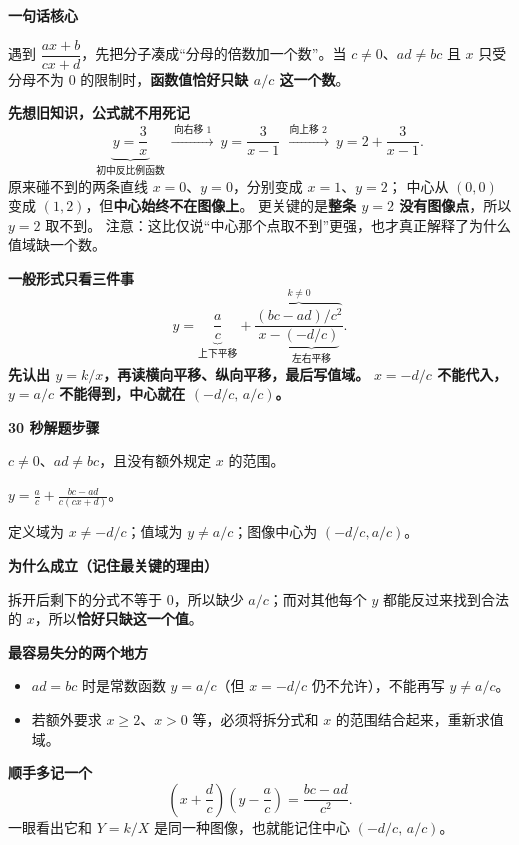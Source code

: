 \begin{summarybox}
    \textbf{\textcolor{CSummary}{一句话核心}}

    遇到 $\dfrac{ax+b}{cx+d}$，先把分子凑成“分母的倍数加一个数”。当 $c\ne0$、$ad\ne bc$ 且 $x$ 只受分母不为 $0$ 的限制时，\textbf{函数值恰好只缺 $a/c$ 这一个数}。

    \medskip

    \medskip
    \textbf{\textcolor{CSummary}{先想旧知识，公式就不用死记}}
    \[
      \underbrace{y=\frac3x}_{\text{初中反比例函数}}
      \ \xrightarrow{\ \text{向右移 }1\ }\
      y=\frac3{x-1}
      \ \xrightarrow{\ \text{向上移 }2\ }\
      \boxed{y=2+\frac3{x-1}}.
    \]
    原来碰不到的两条直线 $x=0$、$y=0$，分别变成 $x=1$、$y=2$；
    中心从 $(0,0)$ 变成 $(1,2)$，但\textbf{中心始终不在图像上}。
    更关键的是\textbf{整条 $y=2$ 没有图像点}，所以 $y=2$ 取不到。
    注意：这比仅说“中心那个点取不到”更强，也才真正解释了为什么值域缺一个数。

    \textbf{\textcolor{CSummary}{一般形式只看三件事}}
    \[
       y=\underbrace{\frac ac}_{\text{上下平移}}
       +\frac{\overbrace{(bc-ad)/c^2}^{k\ne0}}{
          x-\underbrace{(-d/c)}_{\text{左右平移}}}.
    \]
    \textbf{先认出 $y=k/x$，再读横向平移、纵向平移，最后写值域。}
    \textbf{$x=-d/c$ 不能代入，$y=a/c$ 不能得到，中心就在 $(-d/c,\,a/c)$。}

    \textbf{\textcolor{CSummary}{30 秒解题步骤}}
    \begin{description}[style=nextline, leftmargin=2.8em, labelsep=0.5em, itemsep=0.35em]
        \item[\textbf{一看条件：}] $c\ne0$、$ad\ne bc$，且没有额外规定 $x$ 的范围。
        \item[\textbf{二拆分式：}] $\displaystyle y=\frac ac+\frac{bc-ad}{c(cx+d)}$。
        \item[\textbf{三写结果：}] 定义域为 $x\ne-d/c$；值域为 $y\ne a/c$；图像中心为 $(-d/c,a/c)$。
    \end{description}

    \medskip
    \textbf{\textcolor{CSummary}{为什么成立（记住最关键的理由）}}

    拆开后剩下的分式不等于 $0$，所以缺少 $a/c$；而对其他每个 $y$ 都能反过来找到合法的 $x$，所以\textbf{恰好只缺这一个值}。

    \medskip
    \textbf{\textcolor{CSummary}{最容易失分的两个地方}}
    \begin{itemize}[leftmargin=*, itemsep=0.5em, topsep=0.4em]
        \item $ad=bc$ 时是常数函数 $y=a/c$（但 $x=-d/c$ 仍不允许），不能再写 $y\ne a/c$。
        \item 若额外要求 $x\ge2$、$x>0$ 等，必须将拆分式和 $x$ 的范围结合起来，重新求值域。
    \end{itemize}

    \textbf{\textcolor{CSummary}{顺手多记一个}}
    \[
        \left(x+\frac dc\right)\left(y-\frac ac\right)
        =\frac{bc-ad}{c^2}.
    \]
    一眼看出它和 $Y=k/X$ 是同一种图像，也就能记住中心 $\left(-d/c,\,a/c\right)$。
\end{summarybox}

